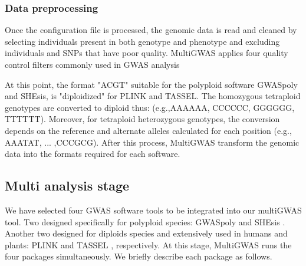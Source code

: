 \subsubsection{Data preprocessing}
Once the configuration file is processed, the genomic data is read and cleaned by selecting individuals present in both genotype and phenotype and excluding individuals and SNPs that have poor quality. MultiGWAS applies four quality control filters commonly used in GWAS analysis

At this point, the format   "ACGT" suitable for the polyploid software GWASpoly and SHEsis, is "diploidized" for PLINK and TASSEL. The homozygous tetraploid genotypes are converted to diploid thus: (e.g.,AAAA\textrightarrow AA, CCCC\textrightarrow CC, GGGG\textrightarrow GG,
TTTT\textrightarrow TT). Moreover, for tetraploid heterozygous genotypes, the conversion depends on the reference and alternate alleles calculated for each position (e.g., AAAT\textrightarrow AT,
... ,CCCG\textrightarrow CG). After this process, MultiGWAS transform the genomic data into the formats required for each software.



\subsection{Multi analysis stage} 

We have selected four GWAS software tools to be integrated into our multiGWAS tool. Two designed specifically for polyploid species: GWASpoly \cite{Rosyara2016} and SHEsis \cite{Yong2006}. Another two designed for diploids species and extensively used in humans and plants: PLINK \cite{Purcell2007,Chang2015} and TASSEL \cite{Bradbury2007}, respectively.  At this stage, MultiGWAS runs the four packages simultaneously. We briefly describe each package as follows.


